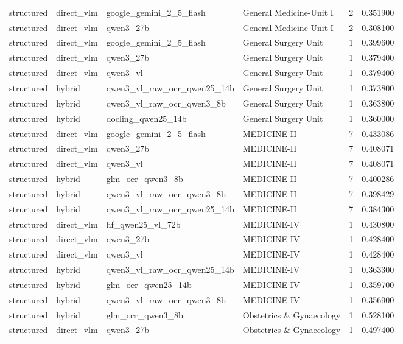 \begin{tabular}{llllrr}
structured & direct\_vlm & google\_gemini\_2\_5\_flash & General Medicine-Unit I & 2 & 0.351900 \\
structured & direct\_vlm & qwen3\_27b & General Medicine-Unit I & 2 & 0.308100 \\
structured & direct\_vlm & google\_gemini\_2\_5\_flash & General Surgery Unit & 1 & 0.399600 \\
structured & direct\_vlm & qwen3\_27b & General Surgery Unit & 1 & 0.379400 \\
structured & direct\_vlm & qwen3\_vl & General Surgery Unit & 1 & 0.379400 \\
structured & hybrid & qwen3\_vl\_raw\_ocr\_qwen25\_14b & General Surgery Unit & 1 & 0.373800 \\
structured & hybrid & qwen3\_vl\_raw\_ocr\_qwen3\_8b & General Surgery Unit & 1 & 0.363800 \\
structured & hybrid & docling\_qwen25\_14b & General Surgery Unit & 1 & 0.360000 \\
structured & direct\_vlm & google\_gemini\_2\_5\_flash & MEDICINE-II & 7 & 0.433086 \\
structured & direct\_vlm & qwen3\_27b & MEDICINE-II & 7 & 0.408071 \\
structured & direct\_vlm & qwen3\_vl & MEDICINE-II & 7 & 0.408071 \\
structured & hybrid & glm\_ocr\_qwen3\_8b & MEDICINE-II & 7 & 0.400286 \\
structured & hybrid & qwen3\_vl\_raw\_ocr\_qwen3\_8b & MEDICINE-II & 7 & 0.398429 \\
structured & hybrid & qwen3\_vl\_raw\_ocr\_qwen25\_14b & MEDICINE-II & 7 & 0.384300 \\
structured & direct\_vlm & hf\_qwen25\_vl\_72b & MEDICINE-IV & 1 & 0.430800 \\
structured & direct\_vlm & qwen3\_27b & MEDICINE-IV & 1 & 0.428400 \\
structured & direct\_vlm & qwen3\_vl & MEDICINE-IV & 1 & 0.428400 \\
structured & hybrid & qwen3\_vl\_raw\_ocr\_qwen25\_14b & MEDICINE-IV & 1 & 0.363300 \\
structured & hybrid & glm\_ocr\_qwen25\_14b & MEDICINE-IV & 1 & 0.359700 \\
structured & hybrid & qwen3\_vl\_raw\_ocr\_qwen3\_8b & MEDICINE-IV & 1 & 0.356900 \\
structured & hybrid & glm\_ocr\_qwen3\_8b & Obstetrics \& Gynaecology & 1 & 0.528100 \\
structured & direct\_vlm & qwen3\_27b & Obstetrics \& Gynaecology & 1 & 0.497400 \\

\end{tabular}
